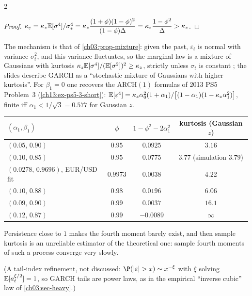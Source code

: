 \begin{paracol}{2}
\begin{proof}
$\kappa_\varepsilon=\kappa_z\mathbb{E}[\sigma^4]/\sigma_*^4=\kappa_z\dfrac{(1+\phi)(1-\phi)^2}{(1-\phi)\Delta}=\kappa_z\dfrac{1-\phi^2}{\Delta}>\kappa_z$.
\end{proof}
The mechanism is that of \cref{ch03:prop-mixture}: given the past, $\varepsilon_t$ is normal with variance $\sigma_t^2$, and this variance fluctuates, so the marginal law is a mixture of
Gaussians with kurtosis $\kappa_z\mathbb{E}[\sigma^4]/(\mathbb{E}[\sigma^2])^2\ge\kappa_z$, strictly unless $\sigma_t$ is constant ; the slides describe GARCH as a ``stochastic mixture of Gaussians with higher kurtosis''.
For $\beta_1=0$ one recovers the ARCH$(1)$ formulas of 2013 PS5 Problem~3 (\cref{ch13:ex-ps5-3-short}): $\mathbb{E}[\varepsilon^4]=\kappa_z\alpha_0^2(1+\alpha_1)/\bigl[(1-\alpha_1)(1-\kappa_z\alpha_1^2)\bigr]$, finite iff $\alpha_1<1/\sqrt3=0.577$ for Gaussian $z$.

\begin{secondary}
\begin{center}\small
\begin{tabular}{@{}lccc@{}}
\toprule
$(\alpha_1,\beta_1)$ & $\phi$ & $1-\phi^2-2\alpha_1^2$ & kurtosis (Gaussian $z$)\\
\midrule
$(0.05,\,0.90)$ & $0.95$ & $0.0925$ & $3.16$\\
$(0.10,\,0.85)$ & $0.95$ & $0.0775$ & $3.77$ (simulation $3.79$)\\
$(0.0278,\,0.9696)$, EUR/USD fit & $0.9973$ & $0.0038$ & $4.22$\\
$(0.10,\,0.88)$ & $0.98$ & $0.0196$ & $6.06$\\
$(0.09,\,0.90)$ & $0.99$ & $0.0037$ & $16.1$\\
$(0.12,\,0.87)$ & $0.99$ & $-0.0089$ & $\infty$\\
\bottomrule
\end{tabular}
\end{center}
\end{secondary}
Persistence close to $1$ makes the fourth moment barely exist, and then sample kurtosis is an unreliable estimator of the theoretical one: sample fourth moments of such a process converge very slowly.
\begin{secondary}
(A tail-index refinement, not discussed: $\P(|\varepsilon|>x)\sim x^{-\xi}$ with $\xi$ solving $\mathbb{E}[a_t^{\xi/2}]=1$, so GARCH tails are power laws, as in the empirical ``inverse cubic'' law of \cref{ch03:sec-heavy}.)
\end{secondary}


\end{paracol}
